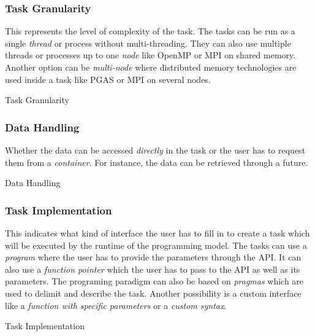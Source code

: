 \subsubsection{Task Granularity}
This represents the level of complexity of the task.
The tasks can be run as a single \textit{thread} or process without multi-threading.
They can also use multiple threads or processes up to one \textit{node} like OpenMP or MPI on shared memory.
Another option can be \textit{multi-node} where distributed memory technologies are used inside a task like PGAS or MPI on several nodes.
\begin{table}[H]
	\caption{Task Granularity}
	\centering
	\begin{multicols}{2}
		

		
	\end{multicols}
\end{table}

\subsubsection{Data Handling}
Whether the data can be accessed \textit{directly} in the task or the user has to request them from a \textit{container}.
For instance, the data can be retrieved through a future.
\begin{table}[H]
	\caption{Data Handling}
	\centering
	\begin{multicols}{2}
		

		
	\end{multicols}
\end{table}

\subsubsection{Task Implementation}
This indicates what kind of interface the user has to fill in to create a task which will be executed by the runtime of the programming model.
The tasks can use a \textit{program} where the user has to provide the parameters through the API.
It can also use a \textit{function pointer} which the user has to pass to the API as well as its parameters.
The programing paradigm can also be based on \textit{pragmas} which are used to delimit and describe the task.
Another possibility is a custom interface like a \textit{function with specific parameters} or a \textit{custom syntax}.
\begin{table}[H]
	\caption{Task Implementation}
	\centering
	\begin{multicols}{2}
		

		
	\end{multicols}
\end{table}

